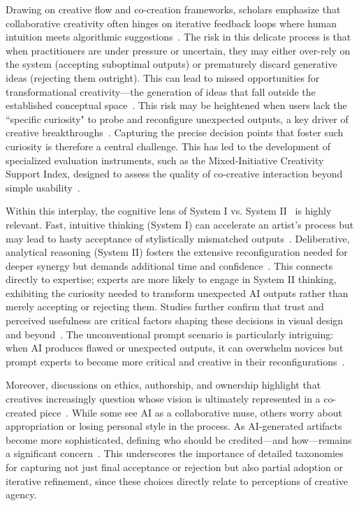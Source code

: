 \documentclass[letterpaper]{article} %
\begin{document}
Drawing on creative flow and co-creation frameworks, scholars emphasize that collaborative creativity often hinges on iterative feedback loops where human intuition meets algorithmic suggestions~\cite{sawyer2006educating,shaer2024ai}. The risk in this delicate process is that when practitioners are under pressure or uncertain, they may either over-rely on the system (accepting suboptimal outputs) or prematurely discard generative ideas (rejecting them outright). This can lead to missed opportunities for transformational creativity—the generation of ideas that fall outside the established conceptual space~\cite{boden2009creativity}. This risk may be heightened when users lack the “specific curiosity" to probe and reconfigure unexpected outputs, a key driver of creative breakthroughs~\cite{grace2015specific}. Capturing the precise decision points that foster such curiosity is therefore a central challenge. This has led to the development of specialized evaluation instruments, such as the Mixed-Initiative Creativity Support Index, designed to assess the quality of co-creative interaction beyond simple usability~\cite{lawton2023drawing}.

Within this interplay, the cognitive lens of System I vs. System II~\cite{kahneman2011fast} is highly relevant. Fast, intuitive thinking (System I) can accelerate an artist’s process but may lead to hasty acceptance of stylistically mismatched outputs~\cite{cao2022understanding}. Deliberative, analytical reasoning (System II) fosters the extensive reconfiguration needed for deeper synergy but demands additional time and confidence~\cite{haase2024human,zhou2024understanding}. This connects directly to expertise; experts are more likely to engage in System II thinking, exhibiting the curiosity needed to transform unexpected AI outputs rather than merely accepting or rejecting them. Studies further confirm that trust and perceived usefulness are critical factors shaping these decisions in visual design and beyond~\cite{dwivedi2023opinion}. The unconventional prompt scenario is particularly intriguing: when AI produces flawed or unexpected outputs, it can overwhelm novices but prompt experts to become more critical and creative in their reconfigurations~\cite{liu2021understanding,lai2023towards}.

Moreover, discussions on ethics, authorship, and ownership highlight that creatives increasingly question whose vision is ultimately represented in a co-created piece~\cite{xu2024artificial}. While some see AI as a collaborative muse, others worry about appropriation or losing personal style in the process. As AI-generated artifacts become more sophisticated, defining who should be credited—and how—remains a significant concern~\cite{formosa2024can}. This underscores the importance of detailed taxonomies for capturing not just final acceptance or rejection but also partial adoption or iterative refinement, since these choices directly relate to perceptions of creative agency.
\end{document}
